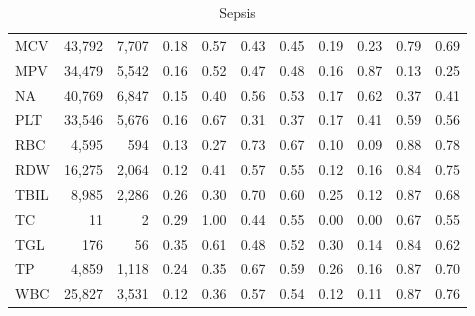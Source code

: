 \begin{table}[ht]
\begin{tabular}{lrrrrrrrrrr}
MCV & 43,792 & 7,707 & 0.18 & 0.57 & 0.43 & 0.45 & 0.19 & 0.23 & 0.79 & 0.69 \\
MPV & 34,479 & 5,542 & 0.16 & 0.52 & 0.47 & 0.48 & 0.16 & 0.87 & 0.13 & 0.25 \\
NA & 40,769 & 6,847 & 0.15 & 0.40 & 0.56 & 0.53 & 0.17 & 0.62 & 0.37 & 0.41 \\
PLT & 33,546 & 5,676 & 0.16 & 0.67 & 0.31 & 0.37 & 0.17 & 0.41 & 0.59 & 0.56 \\
RBC & 4,595 & 594 & 0.13 & 0.27 & 0.73 & 0.67 & 0.10 & 0.09 & 0.88 & 0.78 \\
RDW & 16,275 & 2,064 & 0.12 & 0.41 & 0.57 & 0.55 & 0.12 & 0.16 & 0.84 & 0.75 \\
TBIL & 8,985 & 2,286 & 0.26 & 0.30 & 0.70 & 0.60 & 0.25 & 0.12 & 0.87 & 0.68 \\
TC & 11 & 2 & 0.29 & 1.00 & 0.44 & 0.55 & 0.00 & 0.00 & 0.67 & 0.55 \\
TGL & 176 & 56 & 0.35 & 0.61 & 0.48 & 0.52 & 0.30 & 0.14 & 0.84 & 0.62 \\
TP & 4,859 & 1,118 & 0.24 & 0.35 & 0.67 & 0.59 & 0.26 & 0.16 & 0.87 & 0.70 \\
WBC & 25,827 & 3,531 & 0.12 & 0.36 & 0.57 & 0.54 & 0.12 & 0.11 & 0.87 & 0.76 \\
\bottomrule
\end{tabular}
\caption{Sepsis}
\end{table}